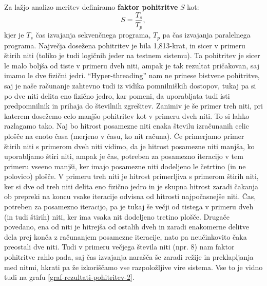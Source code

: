 \documentclass[a4paper,titlepage,11pt]{article}
\begin{document}
Za lažjo analizo meritev definiramo \textbf{faktor pohitritve} $S$ kot:
\begin{equation} \label{enacba-faktor-pohitritve}
S = \frac{T_s}{T_p},
\end{equation}
kjer je $T_s$ čas izvajanja sekvenčnega programa, $T_p$ pa čas izvajanja paralelnega programa. Največja dosežena pohitritev je bila 1,813-krat, in sicer v primeru štirih niti (toliko je tudi logičnih jeder na testnem sistemu). Ta pohitritev je sicer le malo boljša od tiste v primeru dveh niti, ampak je tak rezultat pričakovan, saj imamo le dve fizični jedri. ``Hyper-threading'' nam ne prinese bistvene pohitritve, saj je naše računanje zahtevno tudi iz vidika pomnilniških dostopov, tukaj pa si po dve niti delita eno fizično jedro, kar pomeni, da uporabljata tudi isti predpomnilnik in prihaja do številnih zgrešitev. Zanimiv je še primer treh niti, pri katerem dosežemo celo manjšo pohitritev kot v primeru dveh niti. To si lahko razlagamo tako. Naj bo hitrost posamezne niti enaka številu izračunanih celic plošče na enoto časa (merjeno v času, ko nit računa). Če primerjamo primer štirih niti s primerom dveh niti vidimo, da je hitrost posamezne niti manjša, ko uporabljamo štiri niti, ampak je čas, potreben za posamezno iteracijo v tem primeru vseeno manjši, ker imajo posamezne niti dodeljeno le četrtino (in ne polovico) plošče. V primeru treh niti je hitrost primerljiva s primerom štirih niti, ker si dve od treh niti delita eno fizično jedro in je skupna hitrost zaradi čakanja ob prepreki na koncu vsake iteracije odvisna od hitrosti najpočasnejše niti. Čas, potreben za posamezno iteracijo, pa je tukaj še večji od tistega v primeru dveh (in tudi štirih) niti, ker ima vsaka nit dodeljeno tretino plošče. Drugače povedano, ena od niti je hitrejša od ostalih dveh in zaradi enakomerne delitve dela prej konča z računanjem posamezne iteracije, nato pa neučinkovito čaka preostali dve niti. Tudi v primeru večjega števila niti (npr. 8) nam faktor pohitritve rahlo pada, saj čas izvajanja narašča še zaradi režije in preklapljanja med nitmi, hkrati pa že izkoriščamo vse razpoložljive vire sistema. Vse to je vidno tudi na grafu \ref{graf-rezultati-pohitritev-2}.
\end{document}
